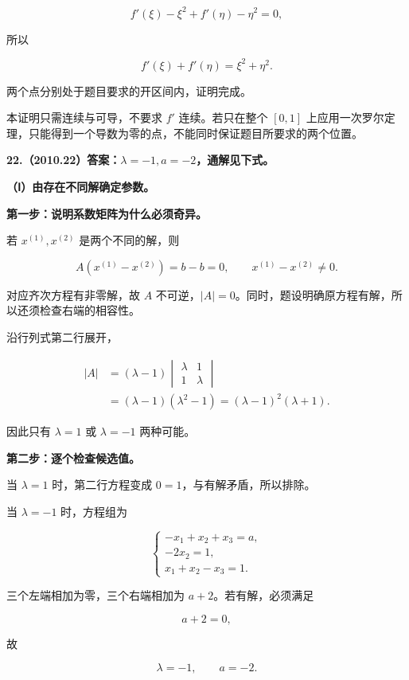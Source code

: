 \documentclass[UTF8,11pt,fontset=windows]{ctexart}
\begin{document}
$$
f'(\xi)-\xi^2+f'(\eta)-\eta^2=0,
$$

所以

$$
\boxed{f'(\xi)+f'(\eta)=\xi^2+\eta^2}.
$$

两个点分别处于题目要求的开区间内，证明完成。

本证明只需连续与可导，不要求 $f'$ 连续。若只在整个 $[0,1]$ 上应用一次罗尔定理，只能得到一个导数为零的点，不能同时保证题目所要求的两个位置。

\clearpage

\textbf{22.（2010.22）答案：$\lambda=-1,a=-2$，通解见下式。}

\textbf{（Ⅰ）由存在不同解确定参数。}

\textbf{第一步：说明系数矩阵为什么必须奇异。}

若 $x^{(1)},x^{(2)}$ 是两个不同的解，则

$$
A(x^{(1)}-x^{(2)})=b-b=0,
\qquad x^{(1)}-x^{(2)}\ne0.
$$

对应齐次方程有非零解，故 $A$ 不可逆，$|A|=0$。同时，题设明确原方程有解，所以还须检查右端的相容性。

沿行列式第二行展开，

$$
\begin{aligned}
|A|
&=(\lambda-1)\begin{vmatrix}\lambda&1\\1&\lambda\end{vmatrix}\\
&=(\lambda-1)(\lambda^2-1)
=(\lambda-1)^2(\lambda+1).
\end{aligned}
$$

因此只有 $\lambda=1$ 或 $\lambda=-1$ 两种可能。

\textbf{第二步：逐个检查候选值。}

当 $\lambda=1$ 时，第二行方程变成 $0=1$，与有解矛盾，所以排除。

当 $\lambda=-1$ 时，方程组为

$$
\begin{cases}
-x_1+x_2+x_3=a,\\
-2x_2=1,\\
x_1+x_2-x_3=1.
\end{cases}
$$

三个左端相加为零，三个右端相加为 $a+2$。若有解，必须满足

$$
a+2=0,
$$

故

$$
\boxed{\lambda=-1,\qquad a=-2}.
$$
\end{document}
